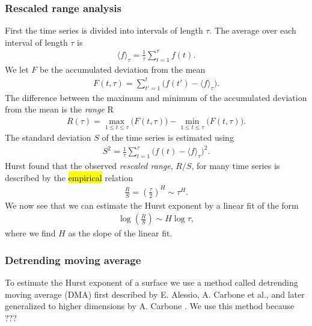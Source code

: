 \subsubsection{Rescaled range analysis}
First the time series is divided into  intervals of length $\tau$. The average over each interval of length $\tau$ is
\begin{align*}
    \langle f \rangle_\tau = \frac{1}{\tau} \sum_{t=1}^\tau f(t).
\end{align*}
We let $F$ be the accumulated deviation from the mean
\begin{align*}
    F(t, \tau) = \sum_{t' = 1}^t \big( f(t') - \langle f \rangle_\tau \big).
\end{align*}
The difference between the maximum and minimum of the accumulated deviation from the mean is the \emph{range} R
\begin{align*}
    R(\tau) = \max_{1 \leq t \leq \tau} \big(F(t,\tau)\big) - \min_{1 \leq t \leq \tau} \big(F(t, \tau)\big).
\end{align*}
The standard deviation $S$ of the time series is estimated using
\begin{align*}
    S^2 = \frac{1}{\tau} \sum_{t=1}^\tau \big( f(t) - \langle f \rangle_\tau \big)^2.
\end{align*}
Hurst found that the observed \emph{rescaled range}, $R/S$, for many time series is described by the \hl{empirical} relation\cite{feder1988fractals}
\begin{align*}
    \frac{R}{S} = \left(\frac{\tau}{2}\right)^H \sim \tau^H.
\end{align*}
We now see that we can estimate the Hurst exponent by a linear fit of the form
\begin{align*}
    \log \left(\frac{R}{S}\right) \sim H\log\tau,
\end{align*}
where we find $H$ as the slope of the linear fit.


\subsubsection{Detrending moving average}
To estimate the Hurst exponent of a surface we use a method called detrending moving average (DMA) first described by E. Alessio, A. Carbone et al.\cite{alessio2002dma}, and later generalized to higher dimensions by A. Carbone \cite{carbone2007algorithm}. We use this method because ??? 

